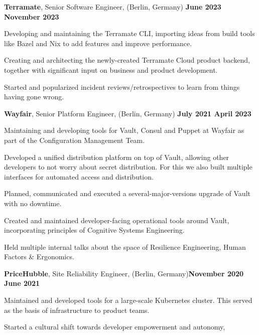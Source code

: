 \documentclass[a4paper]{article}
\renewenvironment{itemize}{
  \begin{list}{}{
      \setlength{\leftmargin}{1em}
      \setlength{\itemsep}{4pt}
  }
}{
\end{list}
}
\begin{document}
\begin{itemize}
\item {\large \textbf{Terramate}, Senior Software Engineer, {\footnotesize(Berlin, Germany)} \hfill \textbf{June 2023 {\textendash} November 2023}}
  \begin{itemize}
  \item Developing and maintaining the Terramate CLI, importing ideas from build
    tools like Bazel and Nix to add features and improve performance.
  \item Creating and architecting the newly-created Terramate Cloud product
    backend, together with significant input on business and product
    development.
  \item Started and popularized incident reviews/retrospectives to learn from
    things having gone wrong.
  \end{itemize}
\item {\large \textbf{Wayfair}, Senior Platform Engineer, {\footnotesize(Berlin, Germany)} \hfill \textbf{July 2021 {\textendash} April 2023}}
  \begin{itemize}
  \item Maintaining and developing tools for Vault, Consul and Puppet at
    Wayfair as part of the Configuration Management Team.
  \item Developed a unified distribution platform on top of Vault, allowing
    other developers to not worry about secret distribution. For this we also
    built multiple interfaces for automated access and distribution.
  \item Planned, communicated and executed a several-major-versions upgrade of
    Vault with no downtime.
  \item Created and maintained developer-facing operational tools around Vault,
    incorporating principles of Cognitive Systems Engineering.
  \item Held multiple internal talks about the space of Resilience Engineering,
    Human Factors \& Ergonomics.
  \end{itemize}
\item {\large \textbf{PriceHubble}, Site Reliability Engineer, {\footnotesize(Berlin, Germany)}\hfill \textbf{November 2020 {\textendash} June 2021}}
  \begin{itemize}
    \item Maintained and developed tools for a large-scale Kubernetes
      cluster. This served as the basis of infrastructure to product teams.
    \item Started a cultural shift towards developer empowerment and autonomy,

\end{itemize}
\end{itemize}
\end{document}
